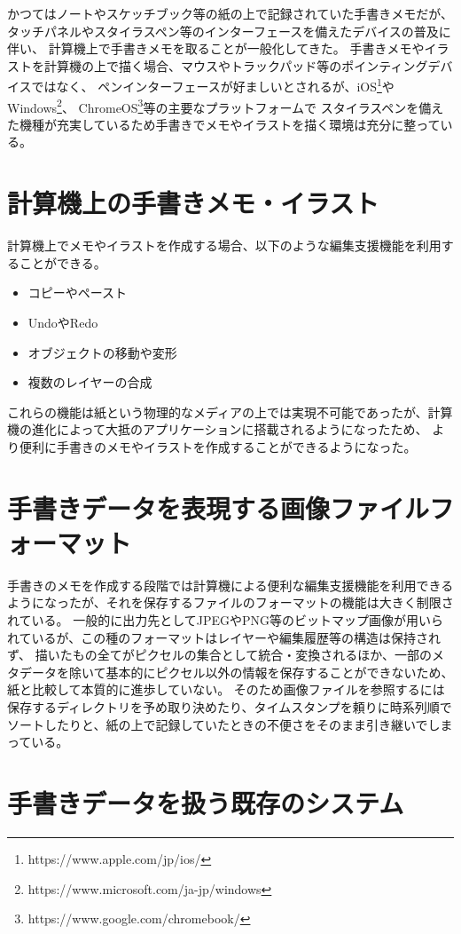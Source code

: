 かつてはノートやスケッチブック等の紙の上で記録されていた手書きメモだが、タッチパネルやスタイラスペン等のインターフェースを備えたデバイスの普及に伴い、
計算機上で手書きメモを取ることが一般化してきた。
手書きメモやイラストを計算機の上で描く場合、マウスやトラックパッド等のポインティングデバイスではなく、
ペンインターフェースが好ましいとされるが、iOS\footnote{https://www.apple.com/jp/ios/}やWindows\footnote{https://www.microsoft.com/ja-jp/windows}、
ChromeOS\footnote{https://www.google.com/chromebook/}等の主要なプラットフォームで
スタイラスペンを備えた機種が充実しているため手書きでメモやイラストを描く環境は充分に整っている。

\section{計算機上の手書きメモ・イラスト}
計算機上でメモやイラストを作成する場合、以下のような編集支援機能を利用することができる。
\begin{itemize}
    \item コピーやペースト
    \item UndoやRedo
    \item オブジェクトの移動や変形
    \item 複数のレイヤーの合成
\end{itemize}
これらの機能は紙という物理的なメディアの上では実現不可能であったが、計算機の進化によって大抵のアプリケーションに搭載されるようになったため、
より便利に手書きのメモやイラストを作成することができるようになった。

\section{手書きデータを表現する画像ファイルフォーマット}
手書きのメモを作成する段階では計算機による便利な編集支援機能を利用できるようになったが、それを保存するファイルのフォーマットの機能は大きく制限されている。
一般的に出力先としてJPEGやPNG等のビットマップ画像が用いられているが、この種のフォーマットはレイヤーや編集履歴等の構造は保持されず、
描いたもの全てがピクセルの集合として統合・変換されるほか、一部のメタデータを除いて基本的にピクセル以外の情報を保存することができないため、紙と比較して本質的に進歩していない。
そのため画像ファイルを参照するには保存するディレクトリを予め取り決めたり、タイムスタンプを頼りに時系列順でソートしたりと、紙の上で記録していたときの不便さをそのまま引き継いでしまっている。

\section{手書きデータを扱う既存のシステム}

